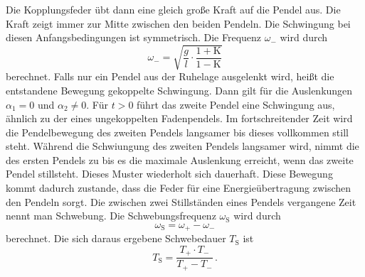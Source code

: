 Die Kopplungsfeder übt dann eine gleich große Kraft auf die Pendel aus. Die Kraft zeigt immer zur Mitte zwischen den beiden Pendeln. 
Die Schwingung bei diesen Anfangsbedingungen ist symmetrisch.
Die Frequenz $\omega_-$ wird durch
\begin{equation}
    \omega_- = \sqrt{\frac{g}{l} \cdot \frac{1 + \text{K}}{1 - \text{K}}}
    \label{eqn:OmegaGegensinnig}
\end{equation}
berechnet. 
Falls nur ein Pendel aus der Ruhelage ausgelenkt wird, heißt die entstandene Bewegung gekoppelte Schwingung. Dann gilt für 
die Auslenkungen $\alpha_1 = 0$ und $\alpha_2 \neq 0$. 
Für $t > 0$ führt das zweite Pendel eine Schwingung aus, ähnlich zu der eines ungekoppelten Fadenpendels. Im fortschreitender Zeit wird die Pendelbewegung des 
zweiten Pendels langsamer bis dieses vollkommen still steht. Während die Schwiungung des zweiten Pendels langsamer wird, nimmt die des ersten Pendels zu bis es die 
maximale Auslenkung erreicht, wenn das zweite Pendel stillsteht. Dieses Muster wiederholt sich dauerhaft. Diese Bewegung kommt dadurch zustande, dass 
die Feder für eine Energieübertragung zwischen den Pendeln sorgt. Die zwischen zwei Stillständen eines Pendels vergangene Zeit nennt man Schwebung.
Die Schwebungsfrequenz $\omega_{\text{S}}$ wird durch 
\begin{equation}
    \omega_{\text{S}} =  \omega_+ - \omega_-
    \label{eqn:OmegaSchwebung}
\end{equation}
berechnet. Die sich daraus ergebene Schwebedauer $T_{\text{S}}$ ist
\begin{equation}
    T_{\text{S}} =  \frac{T_+ \cdot T_-}{T_+ - T_-}\,.
    \label{eqn:TSchwebung}
\end{equation}
 
